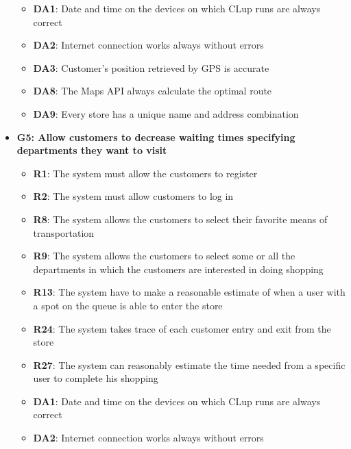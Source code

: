 \documentclass{article}
\begin{document}
\begin{itemize}
\begin{itemize}
						\item {\bfseries DA1}: Date and time on the devices on which CLup runs are always correct
						\item {\bfseries DA2}: Internet connection works always without errors
						\item {\bfseries DA3}: Customer’s position retrieved by GPS is accurate
						\item {\bfseries DA8}: The Maps API always calculate the optimal route 
						\item {\bfseries DA9}: Every store has a unique name and address combination
						
					\end{itemize}

				\item {\bfseries G5: Allow customers to decrease waiting times specifying departments they want to visit}	

					\begin{itemize}
						
						\item {\bfseries R1}: The system must allow the customers to register
						\item {\bfseries R2}: The system must allow customers to log in
						\item {\bfseries R8}: The system allows the customers to select their favorite means of transportation
						\item {\bfseries R9}: The system allows the customers to select some or all the departments in which the customers are interested in doing shopping
						\item {\bfseries R13}: The system have to make a reasonable estimate of when a user with a spot on the queue is able to enter the store
						\item {\bfseries R24}: The system takes trace of each customer entry and exit from the store
						\item {\bfseries R27}: The system can reasonably estimate the time needed from a specific user to complete his shopping \\
		
						\item {\bfseries DA1}: Date and time on the devices on which CLup runs are always correct
						\item {\bfseries DA2}: Internet connection works always without errors
						
					\end{itemize}


\end{itemize}
\end{document}
